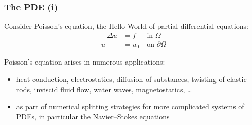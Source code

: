 \begin{frame}
  \frametitle{The PDE (i)}

  Consider Poisson's equation, the Hello World of partial differential
  equations:
  \begin{equation*}
    \begin{split}
      - \Delta u &= f \,\,\, \quad \mbox{in } \Omega
      \\
    u &= u_0 \quad \mbox{on } \partial \Omega
    \end{split}
  \end{equation*}

  Poisson's equation arises in numerous applications:
  \begin{itemize}
  \item
    heat conduction, electrostatics, diffusion
    of substances, twisting of elastic rods, inviscid fluid flow, water
    waves, magnetostatics, \ldots
  \item
    as part of numerical splitting strategies for more complicated
    systems of PDEs, in particular the Navier--Stokes equations
  \end{itemize}

\end{frame}
